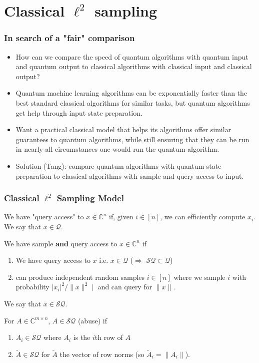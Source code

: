\documentclass{beamer}
\newcommand\0{\mathbf{0}}
\newcommand\CC{\mathbb{C}}
\newcommand\<{\langle}
\renewcommand\>{\rangle}
\renewcommand\implies{\Rightarrow}
\begin{document}
\section{Classical $\ell^2$ sampling}

\begin{frame}
\frametitle{In search of a "fair" comparison}	

\begin{itemize}
\item How can we compare the speed of quantum algorithms with quantum input and quantum output to classical algorithms with classical input and classical output? 
\item Quantum machine learning algorithms can be exponentially faster than the best standard classical algorithms for similar tasks, but quantum algorithms get help through input state preparation. 
\item Want a practical classical model that helps its algorithms offer similar guarantees to quantum algorithms, while still ensuring that they can be run in nearly all circumstances one would run the quantum algorithm. 
\pause
\item Solution (Tang): compare quantum algorithms with quantum state preparation to classical algorithms with sample and query access to input.	
\end{itemize}
\end{frame}


\begin{frame}
\frametitle{Classical $\ell^2$ Sampling Model}
\begin{definition}
We have "query access" to $x \in \CC^n$ if, given $i \in [n]$, we can efficiently compute $x_i$. We say that $x \in \mathcal{Q}$.
\end{definition}
\begin{definition} We have sample \textbf{and} query access to $x \in \CC^n$ if 

\begin{enumerate}
\item We have query access to $x$ i.e. $x\in \mathcal{Q}$ ($\implies$ $\mathcal{SQ} \subset \mathcal{Q}$)
\item can produce independent random samples $i \in [n]$ where we sample $i$ with probability $|x_i|^2/\|x\|^2∣$ and can query for $\|x\|$.
\end{enumerate}
We say that $x \in \mathcal{SQ}$. 
\end{definition}
\begin{definition} For $A \in \CC^{m\times n}$, $A \in \mathcal{SQ}$ (abuse) if

\begin{enumerate}
\item $A_i \in \mathcal{SQ}$ where $A_i$ is the $i$th row of $A$
\item $\tilde{A} \in \mathcal{SQ}$ for $\tilde{A}$ the vector of row norms (so $\tilde{A}_i = \|A_i\|$).	
\end{enumerate}
 
\end{definition}
\end{frame}
\end{document}

